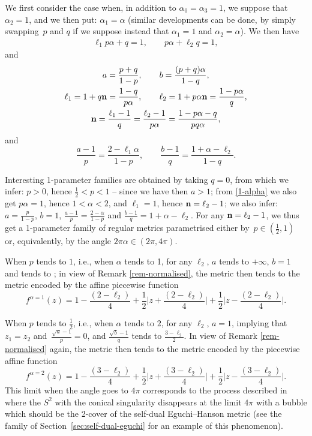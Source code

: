 \documentclass[pdftex]{sigma}
\numberwithin{equation}{section}
\begin{document}
\begin{pc} \label{pc-alpha-032} We first consider the case when, in addition to $\alpha _0 = \alpha _3 = 1$, we suppose that $\alpha _2 = 1$, and we then put: $\alpha _1 = \alpha$ (similar developments can be done, by simply swapping~$p$ and $q$ if we suppose instead that $\alpha _1 = 1$ and $\alpha _2 = \alpha$). We then have
\begin{gather} \label{1-alpha} \ell _1 p \alpha + q = 1, \qquad p \alpha + \ell _2 q = 1, \end{gather}
and
\begin{gather*} a = \frac{p + q}{1 - p}, \qquad b = \frac{(p + q) \alpha}{1 - q},\\
\ell _1 = 1 + q {\bf n} = \frac{1 - q}{p \alpha}, \qquad \ell _2 = 1 + p \alpha {\bf n} = \frac{1 - p \alpha}{q},\\
 {\bf n} = \frac{\ell _1 - 1}{q} = \frac{\ell _2 - 1}{p \alpha} = \frac{1 - p \alpha - q}{p q \alpha}, \end{gather*}
and
\[\frac{a - 1}{p} = \frac{2 - \ell _1 \alpha}{1 - p}, \qquad \frac{b - 1}{q} = \frac{1 + \alpha - \ell _2}{1 - q}. \]
 \end{pc}

Interesting 1-parameter families are obtained by taking $q = 0$, from which we infer: $p > 0$, hence $\frac{1}{2} < p < 1$ -- since we have then $a > 1$; from \eqref{1-alpha} we also get $p \alpha = 1$, hence $1 < \alpha < 2$, and $\ell _1 = 1$, hence ${\bf n} = \ell _2 - 1$; we also infer: $a = \frac{p}{1 - p}$, $b = 1$, $\frac{a - 1}{p} = \frac{2 - \alpha}{1 - p}$ and $\frac{b - 1}{q} = 1 + \alpha - \ell_2$. For any ${\bf n} = \ell _2 - 1$, we thus get a 1-parameter family of regular metrics parametrised either by~$p \in (\frac{1}{2}, 1)$ or, equivalently, by the angle $2\pi\alpha \in (2\pi, 4\pi)$.

When $p$ tends to $1$, i.e., when $\alpha$ tends to 1, for any $\ell _2$, $a$ tends to $+ \infty$, $b = 1$ and  tends to ; in view of Remark \ref{rem-normalised}, the metric then tends to the metric encoded by the affine piecewise function
\[
f ^{\alpha = 1} (z) = 1 - \frac{(2 - \ell _2)}{4} + \frac{1}{2} \Big|z + \frac{(2 - \ell _2)}{4}\Big| + \frac{1}{2} \Big|z - \frac{(2 - \ell _2)}{4}\Big|. \]

When $p$ tends to $\frac{1}{2}$, i.e., when $\alpha$ tends to $2$, for any $\ell _2$, $a = 1$, implying that $z _1 = z _2$ and~$\frac{\sqrt{a} - 1}{p} = 0$, and $\frac{\sqrt{b} - 1}{q}$ tends to $\frac{3 - \ell _2}{2}$. In view of Remark \ref{rem-normalised} again, the metric then tends to the metric encoded by the piecewise affine function
\[%
 f ^{\alpha = 2} (z) = 1 - \frac{(3 - \ell _2)}{4} + \frac{1}{2} \Big|z + \frac{(3 - \ell _2)}{4}\Big| + \frac{1}{2} \Big|z - \frac{(3 - \ell _2)}{4}\Big|. \]
This limit when the angle goes to $4\pi$ corresponds to the process described in \cite[Section~9]{BG} where the $S^2$ with the conical singularity disappears at the limit $4\pi$ with a bubble which should be the 2-cover of the self-dual Eguchi--Hanson metric (see the family of Section~\ref{sec:self-dual-eguchi} for an example of this phenomenon).
\end{document}

